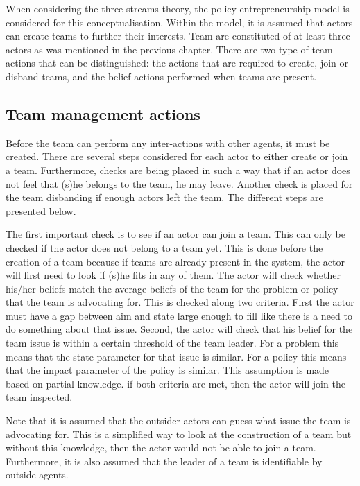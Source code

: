 When considering the three streams theory, the policy entrepreneurship model is considered for this conceptualisation. Within the model, it is assumed that actors can create teams to further their interests. Team are constituted of at least three actors as was mentioned in the previous chapter. There are two type of team actions that can be distinguished: the actions that are required to create, join or disband teams, and the belief actions performed when teams are present.

\subsection{Team management actions}

Before the team can perform any inter-actions with other agents, it must be created. There are several steps considered for each actor to either create or join a team. Furthermore, checks are being placed in such a way that if an actor does not feel that (s)he belongs to the team, he may leave. Another check is placed for the team disbanding if enough actors left the team. The different steps are presented below.

The first important check is to see if an actor can join a team. This can only be checked if the actor does not belong to a team yet. This is done before the creation of a team because if teams are already present in the system, the actor will first need to look if (s)he fits in any of them. The actor will check whether his/her beliefs match the average beliefs of the team for the problem or policy that the team is advocating for. This is checked along two criteria. First the actor must have a gap between aim and state large enough to fill like there is a need to do something about that issue. Second, the actor will check that his belief for the team issue is within a certain threshold of the team leader. For a problem this means that the state parameter for that issue is similar. For a policy this means that the impact parameter of the policy is similar. This assumption is made based on partial knowledge. if both criteria are met, then the actor will join the team inspected.

Note that it is assumed that the outsider actors can guess what issue the team is advocating for. This is a simplified way to look at the construction of a team but without this knowledge, then the actor would not be able to join a team. Furthermore, it is also assumed that the leader of a team is identifiable by outside agents.

